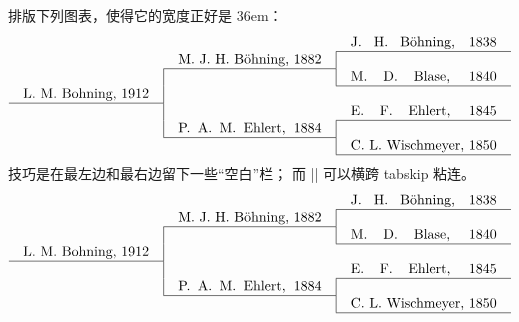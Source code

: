 {{%
\ddangerexercise \1排版下列图表，使得它的宽度正好是 36em：
$$\vbox{\tabskip=0pt \offinterlineskip
\halign to 36em{\tabskip=0pt plus1em#&
  #\hfil&#&#\hfil&#&#\hfil&#\tabskip=0pt\cr
&&&&&\strut J. H. B\"ohning, 1838&\cr
&&&&\multispan3\hrulefill\cr
&&&\strut M. J. H. B\"ohning, 1882&\vrule\cr
&&\multispan3\hrulefill\cr
&&\vrule&&\vrule&\strut M. D. Blase, 1840&\cr
&&\vrule&&\multispan3\hrulefill\cr
&\strut L. M. Bohning, 1912&\vrule\cr
\multispan3\hrulefill\cr
&&\vrule&&&\strut E. F. Ehlert, 1845&\cr
&&\vrule&&\multispan3\hrulefill\cr
&&\vrule&\strut P. A. M. Ehlert, 1884&\vrule\cr
&&\multispan3\hrulefill\cr
&&&&\vrule&\strut C. L. Wischmeyer, 1850&\cr
&&&&\multispan3\hrulefill\cr
}}$$
\answer 技巧是在最左边和最右边留下一些``空白''栏；
而 |\hrulefill| 可以横跨 tabskip 粘连。
\begintt
$$\vbox{\tabskip=0pt \offinterlineskip
\halign to 36em{\tabskip=0pt plus1em#&
  #\hfil&#&#\hfil&#&#\hfil&#\tabskip=0pt\cr
&&&&&\strut J. H. B\"ohning, 1838&\cr
&&&&\multispan3\hrulefill\cr
&&&\strut M. J. H. B\"ohning, 1882&\vrule\cr
&&\multispan3\hrulefill\cr
&&\vrule&&\vrule&\strut M. D. Blase, 1840&\cr
&&\vrule&&\multispan3\hrulefill\cr
&\strut L. M. Bohning, 1912&\vrule\cr
\multispan3\hrulefill\cr
&&\vrule&&&\strut E. F. Ehlert, 1845&\cr
&&\vrule&&\multispan3\hrulefill\cr
&&\vrule&\strut P. A. M. Ehlert, 1884&\vrule\cr
&&\multispan3\hrulefill\cr
&&&&\vrule&\strut C. L. Wischmeyer, 1850&\cr
&&&&\multispan3\hrulefill\cr}}$$
\endtt

}}
